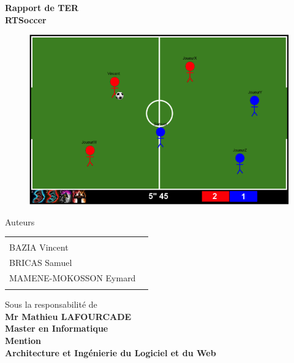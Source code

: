 \begin{titlepage}

\begin{center}

\textup{ {\bf Rapport de TER }}\\[0.5in]

{\huge \bf RTSoccer}\\[0.1in]

\begin{figure}[h!]
\centering
\includegraphics[scale=0.6]{im0.png}
\end{figure}

\normalsize Auteurs \\
\begin{table}[h]
\centering
\begin{tabular}{lr}\hline \\

BAZIA Vincent\\
BRICAS Samuel\\
MAMENE-MOKOSSON Eymard \\

\\\hline 
\end{tabular}
\end{table}

\vspace{.1in}
Sous la responsabilité de\\
{\textbf{Mr Mathieu LAFOURCADE }}\\[0.2in]
{\normalsize  \bf Master en Informatique \\ Mention \\ Architecture et Ingénierie du Logiciel et du Web}\\[0.2in]


\end{center}
\end{titlepage}
